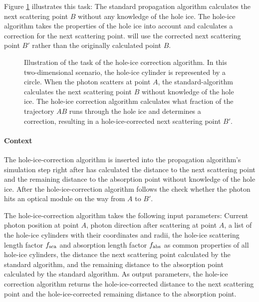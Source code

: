 Figure \ref{fig:Edahi9sh} illustrates this task: The standard
\clsim propagation algorithm calculates the next scattering point \(B\)
without any knowledge of the hole ice. The hole-ice algorithm takes the
properties of the hole ice into account and calculates a correction for
the next scattering point. \clsim will use the corrected next scattering
point \(B'\) rather than the originally calculated point \(B\).

\begin{figure}[htbp]
  \caption{Illustration of the task of the hole-ice correction algorithm. In this two-dimensional scenario, the hole-ice cylinder is represented by a circle. When the photon scatters at point $A$, the standard-\clsim algorithm calculates the next scattering point $B$ without knowledge of the hole ice. The hole-ice correction algorithm calculates what fraction of the trajectory $AB$ runs through the hole ice and determines a correction, resulting in a hole-ice-corrected next scattering point $B'$.}
  \label{fig:Edahi9sh}
\end{figure}

\paragraph{Context}

The hole-ice-correction algorithm is inserted into the
\clsim propagation algorithm's simulation step right after \clsim has
calculated the distance to the next scattering point and the remaining
distance to the absorption point without knowledge of the hole ice.
After the hole-ice-correction algorithm follows the check whether the
photon hits an optical module on the way from \(A\) to \(B'\).

The hole-ice-correction algorithm takes the following input parameters:
Current photon position at point \(A\), photon direction after
scattering at point \(A\), a list of the hole-ice cylinders with their
coordinates and radii, the hole-ice scattering length factor \(f_\text{sca}\)
and absorption length factor \(f_\text{abs}\) as common properties of all
hole-ice cylinders, the distance the next scattering point calculated by
the standard algorithm, and the remaining distance to the absorption
point calculated by the standard algorithm. As output parameters, the
hole-ice correction algorithm returns the hole-ice-corrected distance to
the next scattering point and the hole-ice-corrected remaining distance
to the absorption point.

